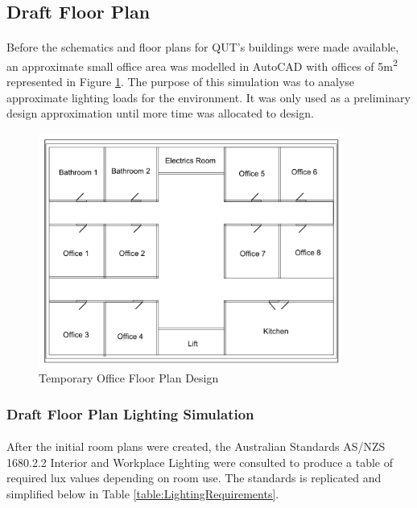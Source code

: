 
\subsection{Draft Floor Plan} \label{section:draft-floor-plan}

\paragraph{}
Before the schematics and floor plans for QUT's buildings were made available, an approximate small office area was modelled in AutoCAD with offices of 5\si{m^2} represented in Figure \ref{fig:RoughFloorplan}. The purpose of this simulation was to analyse approximate lighting loads for the environment. It was only used as a preliminary design approximation until more time was allocated to design.  

\begin{figure}[H]
\hfill\includegraphics[width = 100mm]{images/Rough_Floorplan}\hspace*{\fill}
\caption{Temporary Office Floor Plan Design} 
\label{fig:RoughFloorplan}
\end{figure} 

\subsubsection{Draft Floor Plan Lighting Simulation}

\paragraph{}
After the initial room plans were created, the Australian Standards AS/NZS 1680.2.2 Interior and Workplace Lighting were consulted to produce a table of required lux values depending on room use. The standards is replicated and simplified below in Table \ref{table:LightingRequirements}.

